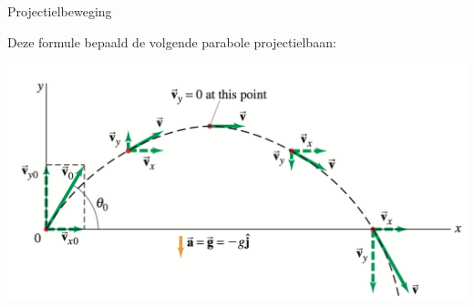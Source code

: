 \begin{app}[Projectielbeweging]{Projectielbeweging}
    \vspace{0.3cm}

    \noindent Deze formule bepaald de volgende parabole projectielbaan:
    \begin{center}
        \includegraphics[scale = 0.28]{Images/Kinematica/Projectielbaan.png}
    \end{center}
\end{app}
